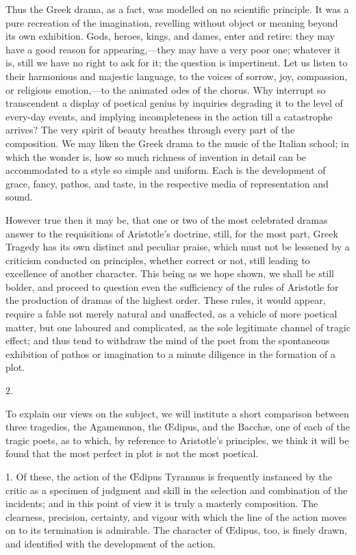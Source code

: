Thus the Greek drama, as a fact, was modelled on no scientific
principle. It was a pure recreation of the imagination, revelling
without object or meaning beyond its own exhibition. Gods, heroes,
kings, and dames, enter and retire: they may have a good reason for
appearing,—they may have a very poor one; whatever it is, still we
have no right to ask for it; the question is impertinent. Let us
listen to their harmonious and majestic language, to the voices of
sorrow, joy, compassion, or religious emotion,—to the animated odes
of the chorus. Why interrupt so transcendent a display of poetical
genius by inquiries degrading it to the level of every-day events, and
implying incompleteness in the action till a catastrophe arrives? The
very spirit of beauty breathes through every part of the composition.
We may liken the Greek drama to the music of the Italian school; in
which the wonder is, how so much richness of invention in detail can
be accommodated to a style so simple and uniform. Each is the
development of grace, fancy, pathos, and taste, in the respective
media of representation and sound.

However true then it may be, that one or two of the most celebrated
dramas answer to the requisitions of Aristotle's doctrine, still, for
the most part, Greek Tragedy has its own distinct and peculiar praise,
which must not be lessened by a criticism conducted on principles,
whether correct or not, still leading to excellence of another
character. This being as we hope shown, we shall be still bolder, and
proceed to question even the sufficiency of the rules of Aristotle for
the production of dramas of the highest order. These rules, it would
appear, require a fable not merely natural and unaffected, as a
vehicle of more poetical matter, but one laboured and complicated, as
the sole legitimate channel of tragic effect; and thus tend to
withdraw the mind of the poet from the spontaneous exhibition of
pathos or imagination to a minute diligence in the formation of a
plot.

2.

To explain our views on the subject, we will institute a short
comparison between three tragedies, the Agamemnon, the Œdipus, and
the Bacchæ, one of each of the tragic poets, as to which, by
reference to Aristotle's principles, we think it will be found that
the most perfect in plot is not the most poetical.

1. Of these, the action of the Œdipus Tyrannus is frequently
instanced by the critic as a specimen of judgment and skill in the
selection and combination of the incidents; and in this point of view
it is truly a masterly composition. The clearness, precision,
certainty, and vigour with which the line of the action moves on to
its termination is admirable. The character of Œdipus, too, is finely
drawn, and identified with the development of the action.


